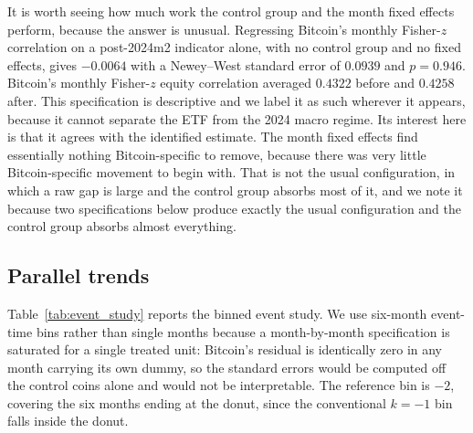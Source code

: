 \documentclass[12pt,a4paper]{article}
\begin{document}
It is worth seeing how much work the control group and the month fixed effects perform, because the answer is unusual. Regressing Bitcoin's monthly Fisher-$z$ correlation on a post-2024m2 indicator alone, with no control group and no fixed effects, gives
$-0.0064$ with a Newey--West standard error of $0.0939$ and
$p = 0.946$. Bitcoin's monthly Fisher-$z$ equity correlation averaged
$0.4322$ before and
$0.4258$ after. This specification is descriptive and we label it as such wherever it appears, because it cannot separate the ETF from the 2024 macro regime. Its interest here is that it agrees with the identified estimate. The month fixed effects find essentially nothing Bitcoin-specific to remove, because there was very little Bitcoin-specific movement to begin with. That is not the usual configuration, in which a raw gap is large and the control group absorbs most of it, and we note it because two specifications below produce exactly the usual configuration and the control group absorbs almost everything.

\subsection{Parallel trends}

Table~\ref{tab:event_study} reports the binned event study. We use six-month event-time bins rather than single months because a month-by-month specification is saturated for a single treated unit: Bitcoin's residual is identically zero in any month carrying its own dummy, so the standard errors would be computed off the control coins alone and would not be interpretable. The reference bin is $-2$, covering the six months ending at the donut, since the conventional $k=-1$ bin falls inside the donut.


\end{document}
